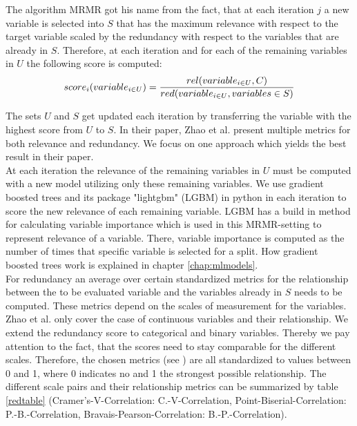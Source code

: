 \documentclass[12pt,titlepage]{article}
\begin{document}
The algorithm MRMR got his name from the fact, that at each iteration $j$ a new variable is selected into $S$ that has the maximum relevance with respect to the target variable scaled by the redundancy with respect to the variables that are already in $S$. Therefore, at each iteration and for each of the remaining variables in $U$ the following score is computed:
\vspace{5mm}
\noindent
\begin{equation} \label{score_raw}
    score_{i}(variable_{i \in U}) = \frac{rel(variable_{i \in U}, C)}{red(variable_{i \in U}, variables \in S)} \\
\end{equation}
\vspace{1mm}

\noindent
The sets $U$ and $S$ get updated each iteration by transferring the variable with the highest score from $U$ to $S$. In their paper, Zhao et al. present multiple metrics for both relevance and redundancy. We focus on one approach which yields the best result in their paper. \\
At each iteration the relevance of the remaining variables in $U$ must be computed with a new model utilizing only these remaining variables. We use gradient boosted trees and its package "lightgbm" (LGBM) in python in each iteration to score the new relevance of each remaining variable. LGBM has a build in method for calculating variable importance which is used in this MRMR-setting to represent relevance of a variable. There, variable importance is computed as the number of times that specific variable is selected for a split. How gradient boosted trees work is explained in chapter \ref{chap:mlmodels}. \\
For redundancy an average over certain standardized metrics for the relationship between the to be evaluated variable and the variables already in $S$ needs to be computed. These metrics depend on the scales of measurement for the variables. Zhao et al. only cover the case of continuous variables and their relationship. We extend the redundancy score to categorical and binary variables. Thereby we pay attention to the fact, that the scores need to stay comparable for the different scales. Therefore, the chosen metrics (see \cite{correlation}) are all standardized to values between 0 and 1, where 0 indicates no and 1 the strongest possible relationship. The different scale pairs and their relationship metrics can be summarized by table \ref{redtable} (Cramer's-V-Correlation: C.-V-Correlation, Point-Biserial-Correlation: P.-B.-Correlation, Bravais-Pearson-Correlation: B.-P.-Correlation).
\end{document}
